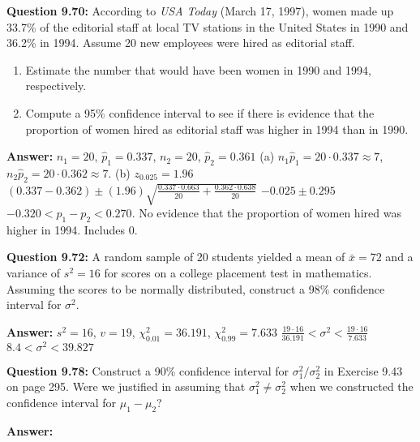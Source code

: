 \documentclass{article}
\begin{document}
\textbf{Question 9.70:}
According to \textit{USA Today} (March 17, 1997),
women made up 33.7\% of the editorial staff at local
TV stations in the United States in 1990 and 36.2\% in
1994. Assume 20 new employees were hired as editorial
staff.
\begin{enumerate}[label = (\alph*) ]
    \item Estimate the number that would have been women
    in 1990 and 1994, respectively.
    \item  Compute a 95\% confidence interval to see if there
    is evidence that the proportion of women hired as
    editorial staff was higher in 1994 than in 1990.
\end{enumerate}
\begin{description}
    \item \textbf{Answer:} $n_1=20$, $\hat{p}_1=0.337$, $n_2=20$, $\hat{p}_2=0.361$\newline
    (a) $n_1\hat{p}_1=20\cdot 0.337 \approx 7$, $n_2\hat{p}_2=20\cdot 0.362\approx 7$.\newline
    (b) $z_{0.025}=1.96$\newline
    $(0.337-0.362)\pm(1.96)\sqrt{\frac{0.337\cdot 0.663}{20}+\frac{0.362\cdot 0.638}{20}}$\newline
    $-0.025\pm 0.295$\newline
    \boldmath$-0.320<p_1-p_2<0.270$. No evidence that the proportion of women hired was higher in 1994.
    Includes 0.
\end{description}

\textbf{Question 9.72:}
A random sample of 20 students yielded a mean
of $\bar{x} = 72$ and a variance of $s^2 = 16$ for scores on a
college placement test in mathematics. Assuming the
scores to be normally distributed, construct a 98\% 
confidence interval for $\sigma^2$.
\begin{description}
    \item \textbf{Answer:} $s^2=16$, $v=19$, $\chi_{0.01}^2=36.191$, $\chi_{0.99}^2=7.633$\newline
    $\frac{19\cdot 16}{36.191} < \sigma^2 < \frac{19\cdot 16}{7.633}$\newline
    \boldmath$8.4 < \sigma^2 < 39.827$
\end{description}

\textbf{Question 9.78:}
Construct a 90\% confidence interval for $\sigma^2_1 / \sigma^2_2$ 
in Exercise 9.43 on page 295. Were we justified in assuming that 
$\sigma^2_1 \not= \sigma^2_2$ when we constructed the confidence
interval for $\mu_1 − \mu_2$?
\begin{description}
    \item \textbf{Answer:} 
\end{description}
\end{document}
